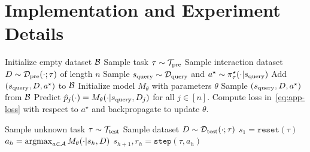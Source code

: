 \section{Implementation and Experiment Details}
\label{app:experiment-details}

\begin{algorithm}
\caption{Decision-Pretrained Transformer (detailed)} 
\begin{algorithmic}[1]
		\STATE {}
        \STATE Initialize empty dataset $\mathcal{B}$
            \STATE Sample task $\tau \sim {\mathcal{T}}_{\text{pre}}$
            \STATE Sample interaction dataset $D \sim \mathcal{D}_{\text{pre}} (\cdot ; \tau)$ of length $n$
            \STATE Sample $s_{\text{query}} \sim \mathcal{D}_{\text{query}}$ and $a^\star \sim \pi^{\star}_\tau(\cdot | s_{\text{query}})$
            \STATE Add $(s_{\text{query}}, D, a^\star)$ to $\mathcal{B}$
        \ENDFOR
        \STATE {}
        \STATE Initialize model $M_{\theta}$ with parameters $\theta$
            \STATE Sample $(s_{\text{query}}, D, a^\star)$ from $\mathcal{B}$
            \STATE Predict $\hat p_j(\cdot) = M_{\theta}(\cdot  | s_{\text{query}}, D_j)$ for all $j \in [n]$.
            \STATE Compute loss in~\eqref{eq:app-loss} with respect to $a^\star$ and backpropagate to update $\theta$.
        \ENDWHILE
        
\end{algorithmic}
\end{algorithm}

\begin{algorithm}
\caption{Offline test-time deployment (detailed)} 
\begin{algorithmic}[1]

        \STATE {}
        \STATE Sample unknown task $\tau \sim {\mathcal{T}}_{\text{test}}$
        \STATE Sample dataset $D \sim \mathcal{D}_{\text{test}}(\cdot; \tau)$
        \STATE {}
        \STATE $s_1 = \texttt{reset}(\tau)$
            \STATE $a_h = \mathop{\mathrm{argmax}}_{a \in \mathcal{A}} M_{\theta} (\cdot | s_h, D)$ 
            \STATE $s_{h + 1}, r_h = \texttt{step}(\tau, a_h)$
        \ENDFOR
\end{algorithmic}
\end{algorithm}

